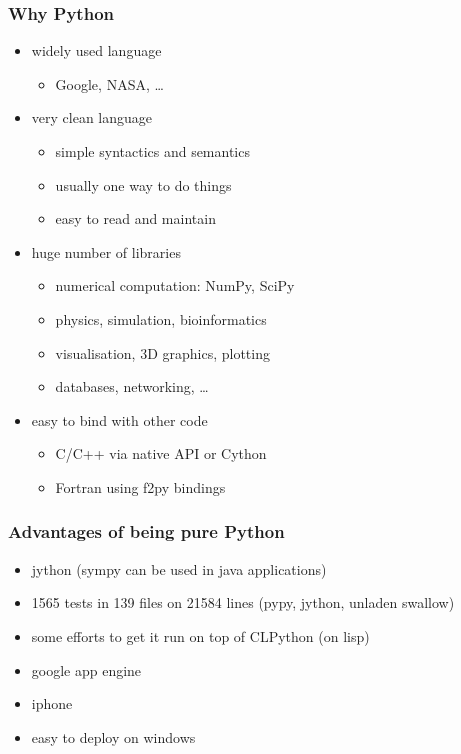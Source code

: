 \documentclass{beamer}
\begin{document}
\begin{frame}[fragile]
    \frametitle{Why Python}

    \begin{itemize}
        \item<1-> widely used language
            \begin{itemize}
                \item Google, NASA, \ldots
            \end{itemize}
        \item<2-> very clean language
            \begin{itemize}
                \item simple syntactics and semantics
                \item usually one way to do things
                \item easy to read and maintain
            \end{itemize}
        \item<3-> huge number of libraries
            \begin{itemize}
                \item numerical computation: NumPy, SciPy
                \item physics, simulation, bioinformatics
                \item visualisation, 3D graphics, plotting
                \item databases, networking, \ldots
            \end{itemize}
        \item<4-> easy to bind with other code
            \begin{itemize}
                \item C/C++ via native API or Cython
                \item Fortran using f2py bindings
            \end{itemize}
    \end{itemize}
\end{frame}

\begin{frame}[fragile]
    \frametitle{Advantages of being pure Python}
    \begin{itemize}
        \item jython (sympy can be used in java applications)
        \item 1565 tests in 139 files on 21584 lines (pypy, jython, unladen swallow)
        \item some efforts to get it run on top of CLPython (on lisp)
        \item google app engine
        \item iphone
        \item easy to deploy on windows
    \end{itemize}
\end{frame}
\end{document}
